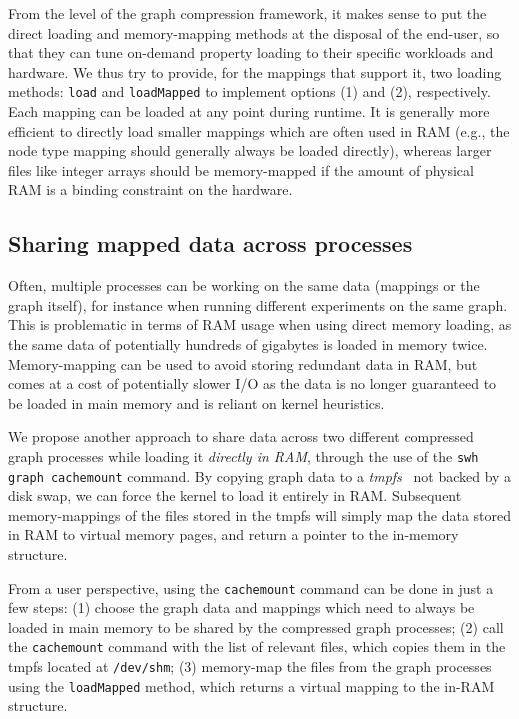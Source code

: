 From the level of the graph compression framework, it makes sense to put the
direct loading and memory-mapping methods at the disposal of the end-user, so
that they can tune on-demand property loading to their specific workloads and
hardware. We thus try to provide, for the mappings that support it, two loading
methods: \texttt{load} and \texttt{loadMapped} to implement options (1) and
(2), respectively.
Each mapping can be loaded at any point during runtime. It is generally more
efficient to directly load smaller mappings which are often used in RAM (e.g.,
the node type mapping should generally always be loaded directly), whereas
larger files like integer arrays should be memory-mapped if the amount of
physical RAM is a binding constraint on the hardware.

\subsection{Sharing mapped data across processes}%
\label{sec:cachemount}

Often, multiple processes can be working on the same data (mappings or the
graph itself), for instance when running different experiments on the same
graph. This is problematic in terms of RAM usage when using direct memory
loading, as the same data of potentially hundreds of gigabytes is loaded in
memory twice. Memory-mapping can be used to avoid storing redundant data in
RAM, but comes at a cost of potentially slower I/O as the data is no longer
guaranteed to be loaded in main memory and is reliant on kernel heuristics.

We propose another approach to share data across two different compressed graph
processes while loading it \emph{directly in RAM}, through the use of the
\texttt{swh graph cachemount} command. By copying graph data to a
\emph{tmpfs}~\cite{snyder1990tmpfs} not backed by a disk swap, we can force the
kernel to load it entirely in RAM\@. Subsequent memory-mappings of the files
stored in the tmpfs will simply map the data stored in RAM to virtual memory
pages, and return a pointer to the in-memory structure.

From a user perspective, using the \texttt{cachemount} command can be done in
just a few steps: (1) choose the graph data and mappings which need to always
be loaded in main memory to be shared by the compressed graph processes; (2)
call the \texttt{cachemount} command with the list of relevant files, which
copies them in the tmpfs located at \texttt{/dev/shm}; (3) memory-map the files
from the graph processes using the \texttt{loadMapped} method, which returns a
virtual mapping to the in-RAM structure.

